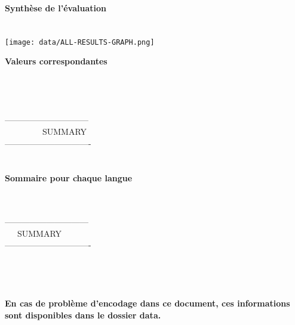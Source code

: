 \documentclass[12pt,a4paper]{article}
\begin{document}
\centering
\vspace{-3cm}
\textbf{\Huge{Synth\`ese de
    l'\'evaluation}\\~\\~\\\normalsize}
\texttt{[image: data/ALL-RESULTS-GRAPH.png]}

\textbf{Valeurs correspondantes}\\~\\

 \\ \\ \\ ------------------------------\\ ~~~~~~~~~SUMMARY\\ -------------------------------\\ \\ \\

\newpage
\textbf{Sommaire pour chaque langue}

 \\ \\ ------------------------------\\ ~~~SUMMARY\\ -------------------------------\\ \\ \\

~\\~\\

\textbf{En  cas  de  probl\`{e}me  d'encodage dans  ce  document,  ces
  informations sont disponibles dans le dossier data.} 

~\\~\\~\\
\end{document}
